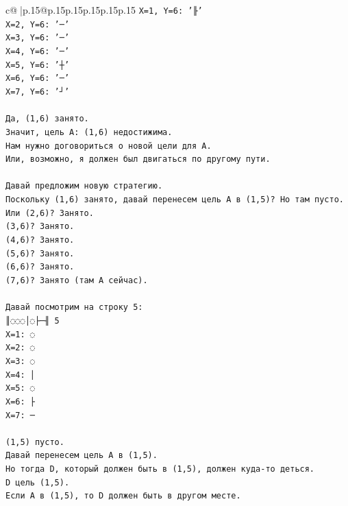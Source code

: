\documentclass{article}
\begin{document}
{\begin{supertabular}{c@{$\;$}|p{.15\linewidth}@{}p{.15\linewidth}p{.15\linewidth}p{.15\linewidth}p{.15\linewidth}p{.15\linewidth}}
{{{\texttt{X=1, Y=6: '╟'} \\
\texttt{X=2, Y=6: '─'} \\
\texttt{X=3, Y=6: '─'} \\
\texttt{X=4, Y=6: '─'} \\
\texttt{X=5, Y=6: '┼'} \\
\texttt{X=6, Y=6: '─'} \\
\texttt{X=7, Y=6: '┘'} \\
\\ 
\texttt{Да, (1,6) занято.} \\
\texttt{Значит, цель A: (1,6) недостижима.} \\
\texttt{Нам нужно договориться о новой цели для A.} \\
\texttt{Или, возможно, я должен был двигаться по другому пути.} \\
\\ 
\texttt{Давай предложим новую стратегию.} \\
\texttt{Поскольку (1,6) занято, давай перенесем цель A в (1,5)? Но там пусто.} \\
\texttt{Или (2,6)? Занято.} \\
\texttt{(3,6)? Занято.} \\
\texttt{(4,6)? Занято.} \\
\texttt{(5,6)? Занято.} \\
\texttt{(6,6)? Занято.} \\
\texttt{(7,6)? Занято (там A сейчас).} \\
\\ 
\texttt{Давай посмотрим на строку 5:} \\
\texttt{║◌◌◌│◌├─╢ 5} \\
\texttt{X=1: ◌} \\
\texttt{X=2: ◌} \\
\texttt{X=3: ◌} \\
\texttt{X=4: │} \\
\texttt{X=5: ◌} \\
\texttt{X=6: ├} \\
\texttt{X=7: ─} \\
\\ 
\texttt{(1,5) пусто.} \\
\texttt{Давай перенесем цель A в (1,5).} \\
\texttt{Но тогда D, который должен быть в (1,5), должен куда{-}то деться.} \\
\texttt{D цель (1,5).} \\
\texttt{Если A в (1,5), то D должен быть в другом месте.} \\
}}}
\end{supertabular}}
\end{document}
